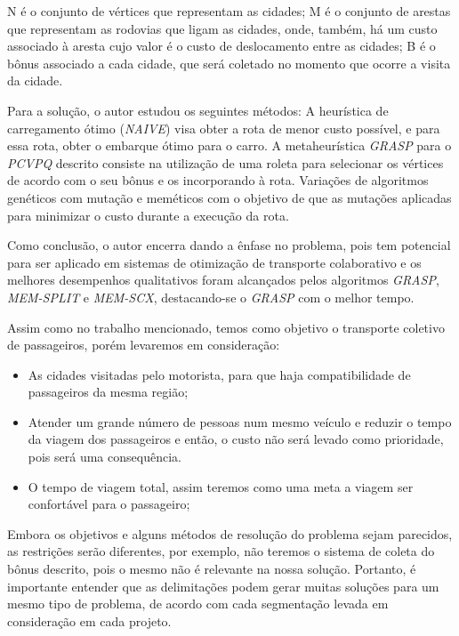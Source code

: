 N é o conjunto de vértices que representam as cidades;
M é o conjunto de arestas que representam as rodovias que ligam as cidades, onde, também, há um custo associado à aresta cujo valor é o custo de deslocamento entre as cidades;
B é o bônus associado a cada cidade, que será coletado no momento que ocorre a visita da cidade.

Para a solução, o autor estudou os seguintes métodos:
A heurística de carregamento ótimo (\emph{NAIVE}) visa obter a rota de menor custo possível, e para essa rota, obter o embarque ótimo para o carro.
A metaheurística \emph{GRASP} para o \emph{PCVPQ} descrito consiste na utilização de uma roleta para selecionar os vértices de acordo com o seu bônus e os incorporando à rota.
Variações de algoritmos genéticos com mutação e meméticos com o objetivo de que as mutações aplicadas para minimizar o custo durante a execução da rota.

Como conclusão, o autor encerra dando a ênfase no problema, pois tem potencial para ser aplicado em sistemas de otimização de transporte colaborativo e os melhores desempenhos qualitativos foram alcançados pelos algoritmos \emph{GRASP}, \emph{MEM-SPLIT} e \emph{MEM-SCX}, destacando-se o \emph{GRASP} com o melhor tempo.

Assim como no trabalho mencionado, temos como objetivo o transporte coletivo de passageiros, porém levaremos em consideração:
\begin{itemize}
    \item As cidades visitadas pelo motorista, para que haja compatibilidade de passageiros da mesma região;
    \item Atender um grande número de pessoas num mesmo veículo e reduzir o tempo da viagem dos passageiros e então, o custo não será levado como prioridade, pois será uma consequência.
    \item O tempo de viagem total, assim teremos como uma meta a viagem ser confortável para o passageiro;
\end{itemize}

Embora os objetivos e alguns métodos de resolução do problema sejam parecidos, as restrições serão diferentes, por exemplo, não teremos o sistema de coleta do bônus descrito, pois o mesmo não é relevante na nossa solução. Portanto, é importante entender que as delimitações podem gerar muitas soluções para um mesmo tipo de problema, de acordo com cada segmentação levada em consideração em cada projeto.

